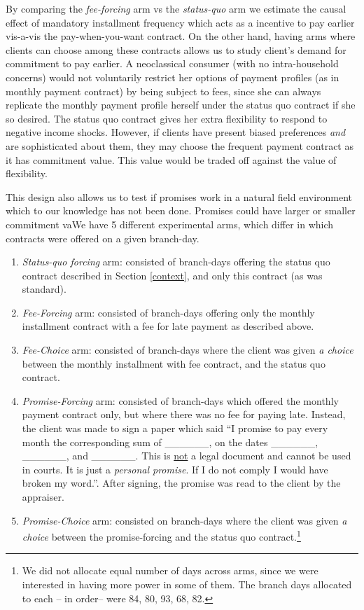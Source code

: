 \documentclass[oneside,11pt]{article}
\begin{document}
By comparing the \textit{fee-forcing} arm vs the \textit{status-quo} arm we estimate the causal effect of mandatory installment frequency which acts as a incentive to pay earlier vis-a-vis the pay-when-you-want contract. On the other hand, having arms where clients can choose among these contracts allows us to study client's demand for commitment to pay earlier. A neoclassical consumer (with no intra-household concerns) would not voluntarily restrict her options of payment profiles (as in monthly payment contract) by being subject to fees, since she can always replicate the monthly payment profile herself under the status quo contract if she so desired. The status quo contract gives her extra flexibility to respond to negative income shocks. However, if clients have present biased preferences \textit{and} are sophisticated about them, they may choose the frequent payment contract as it has commitment value. This value would be traded off against the value of flexibility. 

This design also allows us to test if promises work in a natural field environment which to our knowledge has not been done. Promises could have larger or smaller commitment vaWe have 5 different experimental arms, which differ in which contracts were offered on a given branch-day. 

\begin{enumerate}
    \item \textit{Status-quo forcing} arm: consisted of branch-days offering the status quo contract described in Section \ref{context}, and only this contract (as was standard). 
    \item \textit{Fee-Forcing} arm: consisted of branch-days offering only the monthly installment contract with a fee for late payment as described above. 
    \item \textit{Fee-Choice} arm: consisted of branch-days where the client was given \textit{a choice} between the monthly installment with fee contract, and the status quo contract.
    \item \textit{Promise-Forcing} arm: consisted of branch-days which offered the monthly payment contract only, but where there was no fee for paying late. Instead, the client was made to sign a paper which said ``I promise to pay every month the corresponding sum of \_\_\_\_\_\_, on the dates \_\_\_\_\_\_, \_\_\_\_\_\_, and \_\_\_\_\_\_. This is \underline{not} a legal document and cannot be used in courts. It is just a \textit{personal promise}. If I do not comply I would have broken my word.''. After signing, the promise was read to the client by the appraiser.
    \item \textit{Promise-Choice} arm: consisted on branch-days where the client was given \textit{a choice} between the promise-forcing and the status quo contract.\footnote{We did not allocate equal number of days across arms, since we were interested in having more power in some of them. The branch days allocated to each -- in order-- were 84, 80, 93, 68, 82.}
\end{enumerate}
\end{document}
